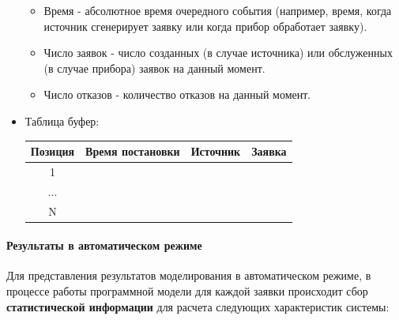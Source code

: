 \documentclass[a4paper, 14pt]{article}
\begin{document}
\begin{itemize}
\begin{itemize}
		      \item Время - абсолютное время очередного события (например, время, когда источник сгенерирует заявку или когда прибор обработает заявку).
		      \item Число заявок - число созданных (в случае источника) или обслуженных (в случае прибора) заявок на данный момент.
		      \item Число отказов - количество отказов на данный момент.
	      \end{itemize}
	\item Таблица буфер:
	      \begin{center}
		      \begin{tabular}{|c|c|c|c|}
			      \hline
			      Позиция & Время постановки & Источник & Заявка \\
			      \hline
			      1       &                  &          &        \\
			      \hline
			      ...     &                  &          &        \\
			      \hline
			      N       &                  &          &        \\
			      \hline
		      \end{tabular}
	      \end{center}
\end{itemize}

\paragraph{Результаты в автоматическом режиме}

Для представления результатов моделирования в автоматическом режиме, в процессе работы программной модели для каждой заявки происходит сбор \textbf{статистической информации} для расчета следующих характеристик системы:
\end{document}
